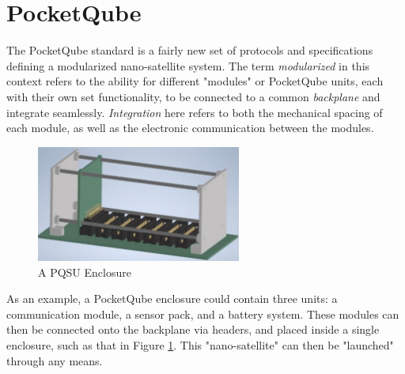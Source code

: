 \graphicspath{{./figures}}

\section{PocketQube}

The PocketQube standard is a fairly new set of protocols and specifications defining a modularized nano-satellite system. The term \textit{modularized} in this context refers to the ability for different "modules" or PocketQube units, each with their own set functionality, to be connected to a common \textit{backplane} and integrate seamlessly. \textit{Integration} here refers to both the mechanical spacing of each module, as well as the electronic communication between the modules.

\begin{figure}[!htb]
    \centering
    \includegraphics[width=0.6\textwidth]{pq_enclosure}
    \caption{A PQSU Enclosure \cite{standard-pqsu}}
    \label{fig:pq_enclosure}
\end{figure}

As an example, a PocketQube enclosure could contain three units: a communication module, a sensor pack, and a battery system. These modules can then be connected onto the backplane via headers, and placed inside a single enclosure, such as that in Figure \ref{fig:pq_enclosure}. This "nano-satellite" can then be "launched" through any means.